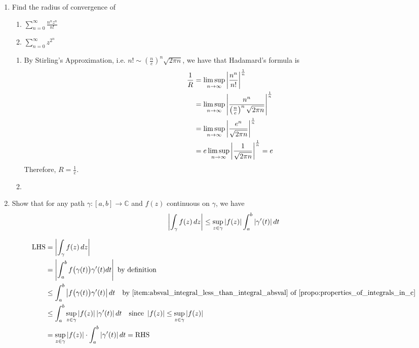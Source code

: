 \documentclass[11pt, oneside]{book}
\begin{document}
\begin{enumerate}
	\item Find the radius of convergence of
		\begin{enumerate}
			\item $\sum_{n=0}^{\infty} \frac{n^n z^n}{n!}$
			\item $\sum_{n=0}^{\infty} z^{2^n}$
		\end{enumerate}

		\begin{solution}
			\begin{enumerate}
				\item By Stirling's Approximation, i.e. $n! \sim (\frac{n}{e})^n \sqrt{2 \pi n}$, we have that Hadamard's formula is
					\begin{align*}
						\frac{1}{R} &= \limsup_{n \to \infty} \left|\frac{n^n}{n!}\right|^\frac{1}{n} \\
							&= \limsup_{n \to \infty} \left|\frac{n^n}{\left(\frac{n}{e} \right)^n \sqrt{2 \pi n}}\right|^\frac{1}{n} \\
							&= \limsup_{n \to \infty} \left|\frac{e^n}{\sqrt{2 \pi n}} \right|^\frac{1}{n} \\
							&= e \limsup_{n \to \infty} \left|\frac{1}{\sqrt{2 \pi n}} \right|^\frac{1}{n} = e
					\end{align*}
					Therefore, $R = \frac{1}{e}$.

					\item {}
			\end{enumerate}
		\end{solution}
	\item Show that for any path $\gamma: [a, b] \to \mathbb{C}$ and $f(z)$ continuous on $\gamma$, we have
		\begin{equation*}
			\left|\int_{\gamma} f(z) \mathop{}\!d{z}\right| \leq \sup_{z \in \gamma} \left|f(z)\right| \int_{a}^{b} \left|\gamma'(t)\right| dt
		\end{equation*}

		\begin{solution}
			\begin{align*}
				\text{LHS} &= \abs{\int_{\gamma} f(z) \dif{z}} \\
					&= \abs{\int_{a}^{b} f\big( \gamma(t) \big) \gamma'(t) dt} \text{ by definition} \\
					&\leq \int_{a}^{b} \abs{f\big( \gamma(t) \big) \gamma'(t)} dt \quad \text{by } \cref{item:absval_integral_less_than_integral_absval} \text{ of } \cref{propo:properties_of_integrals_in_c} \\
					&\leq \int_{a}^{b} \sup_{z \in \gamma} \abs{f(z)} \abs{\gamma'(t)} dt \quad \text{since } \abs{f(z)} \leq \sup_{z \in \gamma} \abs{f(z)} \\
					&= \sup_{z \in \gamma} \abs{f(z)} \cdot \int_{a}^{b} \abs{\gamma'(t)} dt = \text{RHS}
			\end{align*}
		\end{solution}
\end{enumerate}
\end{document}
